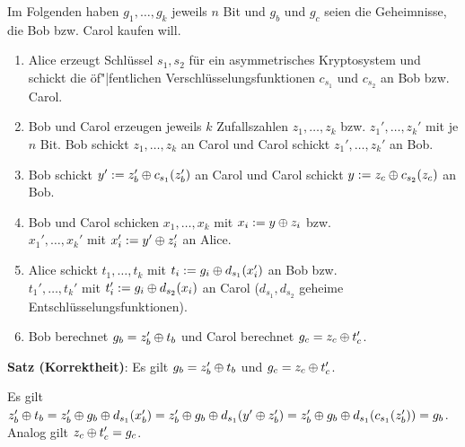 Im Folgenden haben $g_1, \dotsc, g_k$ jeweils $n$ Bit
und $g_b$ und $g_c$ seien die Geheimnisse, die Bob bzw. Carol kaufen will.
\begin{enumerate}
    \item
    Alice erzeugt Schlüssel $s_1, s_2$ für ein asymmetrisches Kryptosystem und schickt
    die öf"|fentlichen Verschlüsselungsfunktionen $c_{s_1}$ und $c_{s_2}$ an Bob bzw. Carol.
    
    \item
    Bob und Carol erzeugen jeweils $k$ Zufallszahlen $z_1, \dotsc, z_k$ bzw.
    $z_1', \dotsc, z_k'$ mit je $n$ Bit.
    Bob schickt $z_1, \dotsc, z_k$ an Carol und
    Carol schickt $z_1', \dotsc, z_k'$ an Bob.
    
    \item
    Bob schickt $y' := z_b' \oplus c_{s_1}(z_b')$ an Carol und
    Carol schickt $y := z_c \oplus c_{s_2}(z_c)$ an Bob.
    
    \item
    Bob und Carol schicken $x_1, \dotsc, x_k$ mit $x_i := y \oplus z_i$ bzw.\\
    $x_1', \dotsc, x_k'$ mit $x_i' := y' \oplus z_i'$ an Alice.
    
    \item
    Alice schickt $t_1, \dotsc, t_k$ mit $t_i := g_i \oplus d_{s_1}(x_i')$ an Bob bzw.\\
    $t_1', \dotsc, t_k'$ mit $t_i' := g_i \oplus d_{s_2}(x_i)$ an Carol
    ($d_{s_1}, d_{s_2}$ geheime Entschlüsselungsfunktionen).
    
    \item
    Bob berechnet $g_b = z_b' \oplus t_b$ und
    Carol berechnet $g_c = z_c \oplus t_c'$.
\end{enumerate}

\linie

\textbf{Satz (Korrektheit)}:
Es gilt $g_b = z_b' \oplus t_b$ und $g_c = z_c \oplus t_c'$.

\begin{Beweis}
    Es gilt $z_b' \oplus t_b = z_b' \oplus g_b \oplus d_{s_1}(x_b')
    = z_b' \oplus g_b \oplus d_{s_1}(y' \oplus z_b') = z_b' \oplus g_b \oplus d_{s_1}(c_{s_1}(z_b')) = g_b$.
    Analog gilt $z_c \oplus t_c' = g_c$.
\end{Beweis}

\linie

